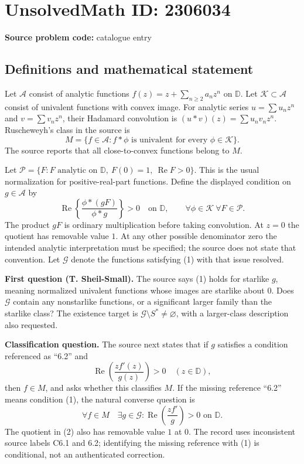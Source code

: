 \documentclass[11pt]{article}
\begin{document}
\section*{UnsolvedMath ID: 2306034}
\textbf{Source problem code:} catalogue entry
\subsection{Definitions and mathematical statement}
Let $\mathcal A$ consist of analytic functions $f(z)=z+\sum_{n\geq2}a_nz^n$ on $\mathbb D$. Let $\mathcal K\subset\mathcal A$ consist of univalent functions with convex image. For analytic series $u=\sum u_nz^n$ and $v=\sum v_nz^n$, their Hadamard convolution is $(u*v)(z)=\sum u_nv_nz^n$. Ruscheweyh's class in the source is
\[
 M=\{f\in\mathcal A:f*\phi\text{ is univalent for every }\phi\in\mathcal K\}.
\]
The source reports that all close-to-convex functions belong to $M$.

Let $\mathcal P=\{F:F\text{ analytic on }\mathbb D,\ F(0)=1,\ \operatorname{Re}F>0\}$. This is the usual normalization for positive-real-part functions. Define the displayed condition on $g\in\mathcal A$ by
\[
 \operatorname{Re}\left\{\frac{\phi*(gF)}{\phi*g}\right\}>0
 \quad\text{on }\mathbb D,
 \qquad\forall\phi\in\mathcal K\ \forall F\in\mathcal P. \tag{1}
\]
The product $gF$ is ordinary multiplication before taking convolution. At $z=0$ the quotient has removable value $1$. At any other possible denominator zero the intended analytic interpretation must be specified; the source does not state that convention. Let $\mathcal G$ denote the functions satisfying (1) with that issue resolved.

\textbf{First question (T. Sheil-Small).} The source says (1) holds for starlike $g$, meaning normalized univalent functions whose images are starlike about $0$. Does $\mathcal G$ contain any nonstarlike functions, or a significant larger family than the starlike class? The existence target is $\mathcal G\setminus S^*\ne\varnothing$, with a larger-class description also requested.

\textbf{Classification question.} The source next states that if $g$ satisfies a condition referenced as ``6.2'' and
\[
 \operatorname{Re}\left(\frac{zf'(z)}{g(z)}\right)>0\quad(z\in\mathbb D), \tag{2}
\]
then $f\in M$, and asks whether this classifies $M$. If the missing reference ``6.2'' means condition (1), the natural converse question is
\[
 \forall f\in M\quad\exists g\in\mathcal G:
 \operatorname{Re}\left(\frac{zf'}g\right)>0\text{ on }\mathbb D.
\]
The quotient in (2) also has removable value $1$ at $0$. The record uses inconsistent source labels C6.1 and 6.2; identifying the missing reference with (1) is conditional, not an authenticated correction.
\end{document}
